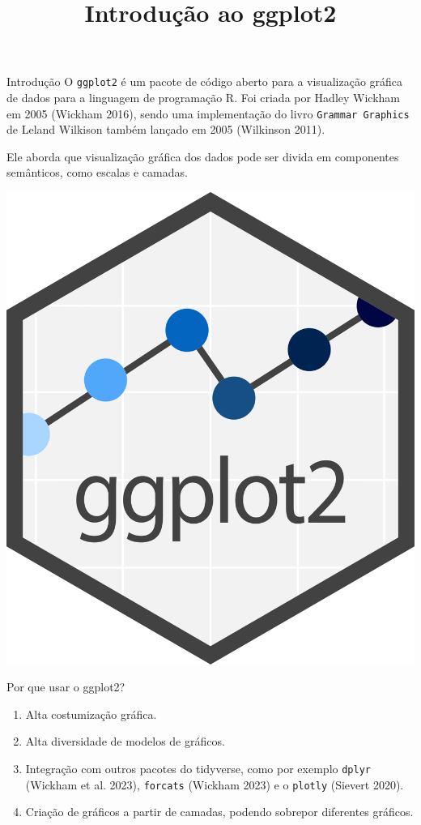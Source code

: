 \documentclass[
  ignorenonframetext,
]{beamer}
\title{Introdução ao ggplot2}
\author{}
\date{}
\begin{document}
\frame{\titlepage}


\begin{frame}[fragile]{Introdução}
\label{introduuxe7uxe3o}
O \texttt{ggplot2} é um pacote de código aberto para a visualização
gráfica de dados para a linguagem de programação R. Foi criada por
Hadley Wickham em 2005 (Wickham 2016), sendo uma implementação do livro
\texttt{Grammar\ Graphics} de Leland Wilkison também lançado em 2005
(Wilkinson 2011).

Ele aborda que visualização gráfica dos dados pode ser divida em
componentes semânticos, como escalas e camadas.

\begin{center}
\includegraphics[width=0.2\linewidth,height=\textheight,keepaspectratio]{Ggplot2_hex_logo.svg.png}
\end{center}
\end{frame}

\begin{frame}[fragile]{Por que usar o ggplot2?}
\label{por-que-usar-o-ggplot2}
\begin{enumerate}
\item
  Alta costumização gráfica.
\item
  Alta diversidade de modelos de gráficos.
\item
  Integração com outros pacotes do tidyverse, como por exemplo
  \texttt{dplyr} (Wickham et al. 2023), \texttt{forcats} (Wickham 2023)
  e o \texttt{plotly} (Sievert 2020).
\item
  Criação de gráficos a partir de camadas, podendo sobrepor diferentes
  gráficos.
\end{enumerate}
\end{frame}
\end{document}
